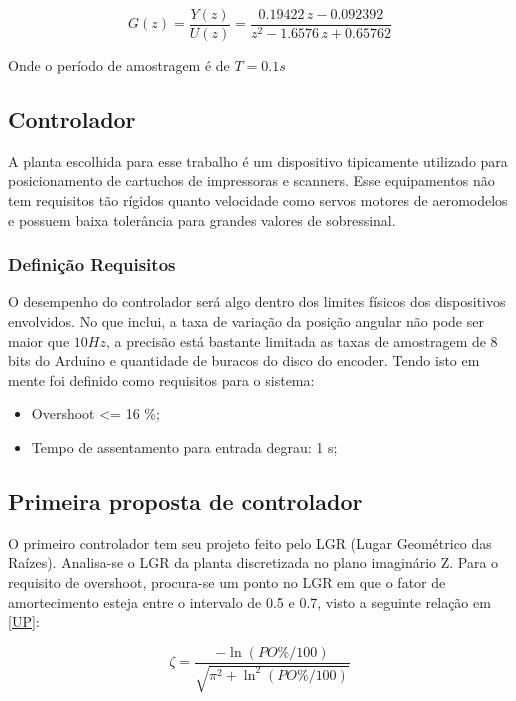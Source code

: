 \documentclass[a4paper,11pt]{article}
\begin{document}
\begin{equation}
G(z) = \frac{Y(z)}{U(z)} = \frac{0.19422\,z-0.092392}{z^2-1.6576\,z+0.65762}
\label{transfdisc}
\end{equation}

Onde o período de amostragem é de $T = 0.1s$

\subsection{Controlador}

A planta escolhida para esse trabalho é um dispositivo tipicamente utilizado para posicionamento de cartuchos de impressoras e scanners. Esse equipamentos não tem requisitos tão rígidos quanto velocidade como servos motores de aeromodelos e possuem baixa tolerância para grandes valores de sobressinal. 

\subsubsection{Definição Requisitos}

O desempenho do controlador será algo dentro dos limites físicos dos dispositivos envolvidos. No que inclui, a taxa de variação da posição angular não pode ser maior que $10Hz$, a precisão está bastante limitada as taxas de amostragem de 8 bits do Arduino e quantidade de buracos do disco do encoder. Tendo isto em mente foi definido como requisitos para o sistema:


\begin{itemize}
   \item Overshoot <= 16 \%;
   \item Tempo de assentamento para entrada degrau: 1 s;
 \end{itemize}

\subsection{Primeira proposta de controlador}

O primeiro controlador tem seu projeto feito pelo LGR (Lugar Geométrico das Raízes). Analisa-se o LGR da planta discretizada no plano imaginário Z. Para o requisito de overshoot, procura-se um ponto no LGR em que o fator de amortecimento esteja entre o intervalo de 0.5 e 0.7, visto a seguinte relação em \ref{UP}:

\begin{equation}
\zeta=\frac{-\ln \left(P O\% / 100\right)}{\sqrt{\pi^{2}+\ln ^{2}\left(P O\% / 100\right)}}
\label{UP}
\end{equation}
\end{document}
